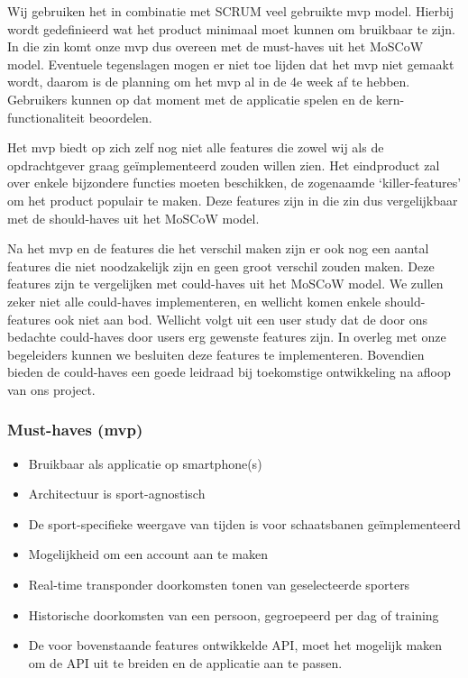 Wij gebruiken het in combinatie met SCRUM veel gebruikte \acf{mvp} model. Hierbij wordt gedefinieerd wat het product minimaal moet kunnen om bruikbaar te zijn. In die zin komt onze \ac{mvp} dus overeen met de must-haves uit het MoSCoW model. Eventuele tegenslagen mogen er niet toe lijden dat het \ac{mvp} niet gemaakt wordt, daarom is de planning om het \ac{mvp} al in de 4e week af te hebben. Gebruikers kunnen op dat moment met de applicatie spelen en de kern-functionaliteit beoordelen.

Het \ac{mvp} biedt op zich zelf nog niet alle features die zowel wij als de opdrachtgever graag geïmplementeerd zouden willen zien. Het eindproduct zal over enkele bijzondere functies moeten beschikken, de zogenaamde `killer-features' om het product populair te maken. Deze features zijn in die zin dus vergelijkbaar met de should-haves uit het MoSCoW model.

Na het \ac{mvp} en de features die het verschil maken zijn er ook nog een aantal features die niet noodzakelijk zijn en geen groot verschil zouden maken. Deze features zijn te vergelijken met could-haves uit het MoSCoW model. We zullen zeker niet alle could-haves implementeren, en wellicht komen enkele should-features ook niet aan bod. Wellicht volgt uit een user study dat de door ons bedachte could-haves door users erg gewenste features zijn. In overleg met onze begeleiders kunnen we besluiten deze features te implementeren. Bovendien bieden de could-haves een goede leidraad bij toekomstige ontwikkeling na afloop van ons project.

\subsubsection{Must-haves (\ac{mvp})}

\begin{itemize}
    \item Bruikbaar als applicatie op smartphone(s)
    \item Architectuur is sport-agnostisch
    \item De sport-specifieke weergave van tijden is voor schaatsbanen geïmplementeerd
    \item Mogelijkheid om een account aan te maken
    \item Real-time transponder doorkomsten tonen van geselecteerde sporters
    \item Historische doorkomsten van een persoon, gegroepeerd per dag of training
    \item De voor bovenstaande features ontwikkelde API, moet het mogelijk maken om de API uit te breiden en de applicatie aan te passen.
\end{itemize}

